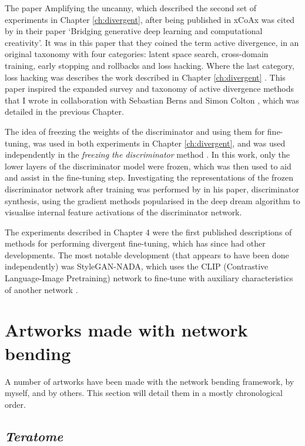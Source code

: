 The paper Amplifying the uncanny, which described the second set of experiments in Chapter \ref{ch:divergent}, after being published in xCoAx was cited by \cite{berns2020bridging} in their paper ‘Bridging generative deep learning and computational creativity’. 
It was in this paper that they coined the term active divergence, in an original taxonomy with four categories: latent space search, cross-domain training, early stopping and rollbacks and loss hacking. 
Where the last category, loss hacking was describes the work described in Chapter \ref{ch:divergent} . 
This paper inspired the expanded survey and taxonomy of active divergence methods that I wrote in collaboration with Sebastian Berns and Simon Colton \citep{broad2021active}, which was detailed in the previous Chapter.

The idea of freezing the weights of the discriminator and using them for fine-tuning, was used in both experiments in Chapter \ref{ch:divergent}, and was used independently in the \textit{freezing the discriminator} method \citep{mo2020freeze}. In this work, only the lower layers of the discriminator model were frozen, which was then used to aid and assist in the fine-tuning step.
Investigating the representations of the frozen discriminator network after training was performed by \citet{porres2021discriminator} in his paper, discriminator synthesis, using the gradient methods popularised in the deep dream algorithm to visualise internal feature activations of the discriminator network.

The experiments described in Chapter 4 were the first published descriptions of methods for performing divergent fine-tuning, which has since had other developments. 
The most notable development (that appears to have been done independently) was StyleGAN-NADA, which uses the CLIP (Contrastive Language-Image Pretraining) \cite{radford2021learning} network to fine-tune with auxiliary characteristics of another network \citep{gal2022stylegan}.

\section{Artworks made with network bending}
\label{c7:sec:net-bend-artworks}

A number of artworks have been made with the network bending framework, by myself, and by others. 
This section will detail them in a mostly chronological order.

\subsection{\textit{Teratome}}
\label{c7:subsubsec:teratome}

